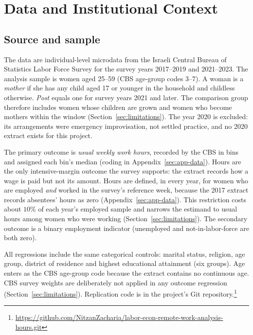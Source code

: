 \documentclass[12pt,a4paper]{article}
\begin{document}
\section{Data and Institutional Context}\label{sec:data}

\subsection{Source and sample}

The data are individual-level microdata from the Israeli Central Bureau of Statistics Labor Force
Survey for the survey years 2017--2019 and 2021--2023. The analysis sample is women aged 25--59
(CBS age-group codes 3--7). A woman is a \emph{mother} if she has any child aged 17 or younger in
the household and childless otherwise. \emph{Post} equals one for survey years 2021 and later.
The comparison group therefore includes women whose children are grown and women who become
mothers within the window (Section~\ref{sec:limitations}). The year 2020 is excluded: its
arrangements were emergency improvisation, not settled practice, and no 2020 extract exists for
this project.

\noindent The primary outcome is \emph{usual weekly work hours}, recorded by the CBS in bins and assigned
each bin's median (coding in Appendix~\ref{sec:app-data}). Hours are the only intensive-margin
outcome the survey supports: the extract records how a wage is paid but not its amount. Hours
are defined, in every year, for women who are employed \emph{and} worked in the survey's
reference week, because the 2017 extract records absentees' hours as zero
(Appendix~\ref{sec:app-data}). This restriction costs about $10\%$ of each year's employed sample
and narrows the estimand to usual hours among women who were working
(Section~\ref{sec:limitations}). The secondary outcome is a binary employment indicator
(unemployed and not-in-labor-force are both zero).

\noindent All regressions include the same categorical controls: marital status, religion, age group,
district of residence and highest educational attainment (six groups). Age enters as the CBS
age-group code because the extract contains no continuous age. CBS survey weights are
deliberately not applied in any outcome regression (Section~\ref{sec:limitations}). Replication
code is in the project's Git
repository.\footnote{\url{https://github.com/NitzanZacharia/labor-econ-remote-work-analysis-hours.git}}
\end{document}

